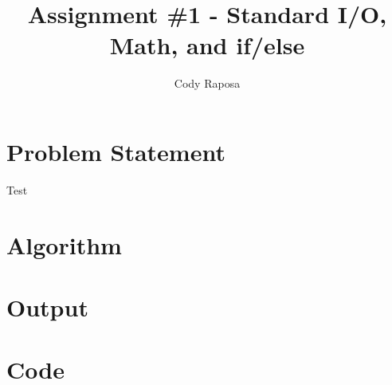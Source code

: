 \documentclass{article}
\title{Assignment \#1 - Standard I/O, Math, and if/else}
\author{Cody Raposa}
\affil{ELEC2850 Microcontrollers Using C Programming}
\begin{document}
\maketitle
\begin{flushleft}
	\section{Problem Statement}
	Test
	\section{Algorithm}
	\section{Output}
	\section{Code}
	
\end{flushleft}
\end{document}
